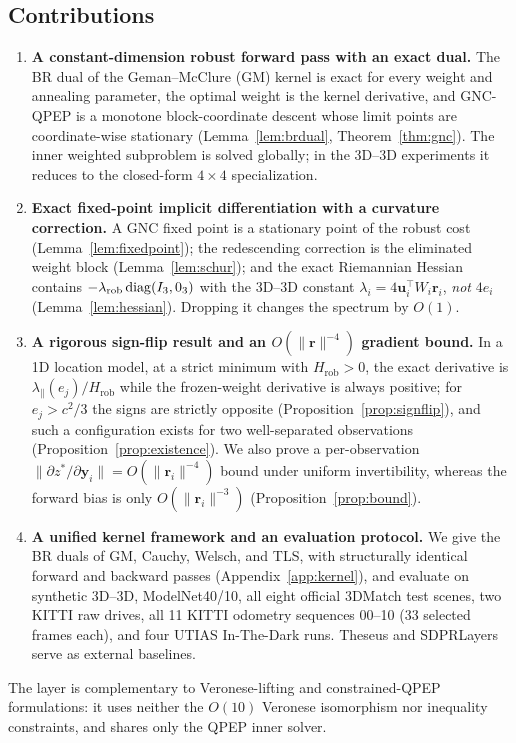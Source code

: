 \subsection{Contributions}

\begin{enumerate}
\item \textbf{A constant-dimension robust forward pass with an exact dual.} The BR dual of the
  Geman--McClure (GM) kernel is exact for every weight and annealing parameter, the optimal weight
  is the kernel derivative, and GNC-QPEP is a monotone block-coordinate descent whose limit points
  are coordinate-wise stationary (Lemma~\ref{lem:brdual}, Theorem~\ref{thm:gnc}). The inner
  weighted subproblem is solved globally; in the 3D--3D experiments it reduces to the closed-form
  $4\times4$ specialization.
\item \textbf{Exact fixed-point implicit differentiation with a curvature correction.} A GNC fixed
  point is a stationary point of the robust cost (Lemma~\ref{lem:fixedpoint}); the redescending
  correction is the eliminated weight block (Lemma~\ref{lem:schur}); and the exact Riemannian
  Hessian contains $-\lambda_{\mathrm{rob}}\operatorname{diag}(I_3,0_3)$ with the 3D--3D constant
  $\lambda_i=4\mathbf{u}_i^\top W_i\mathbf{r}_i$, \emph{not} $4e_i$ (Lemma~\ref{lem:hessian}).
  Dropping it changes the spectrum by $O(1)$.
\item \textbf{A rigorous sign-flip result and an $O(\|\mathbf{r}\|^{-4})$ gradient bound.} In a 1D
  location model, at a strict minimum with $H_{\mathrm{rob}}>0$, the exact derivative is
  $\lambda_\parallel(e_j)/H_{\mathrm{rob}}$ while the frozen-weight derivative is always positive;
  for $e_j>c^2/3$ the signs are strictly opposite (Proposition~\ref{prop:signflip}), and such a
  configuration exists for two well-separated observations (Proposition~\ref{prop:existence}). We
  also prove a per-observation $\|\partial z^*/\partial\mathbf{y}_i\|=O(\|\mathbf{r}_i\|^{-4})$
  bound under uniform invertibility, whereas the forward bias is only $O(\|\mathbf{r}_i\|^{-3})$
  (Proposition~\ref{prop:bound}).
\item \textbf{A unified kernel framework and an evaluation protocol.} We give the BR duals of
  GM, Cauchy, Welsch, and TLS, with structurally identical forward and backward passes
  (Appendix~\ref{app:kernel}), and evaluate on synthetic 3D--3D, ModelNet40/10, all eight official
  3DMatch test scenes, two KITTI raw drives, all 11 KITTI odometry sequences 00--10 (33 selected
  frames each), and four UTIAS In-The-Dark runs. Theseus and SDPRLayers serve as external baselines.
\end{enumerate}

The layer is complementary to Veronese-lifting and constrained-QPEP formulations: it uses neither
the $O(10)$ Veronese isomorphism nor inequality constraints, and shares only the QPEP inner solver.
